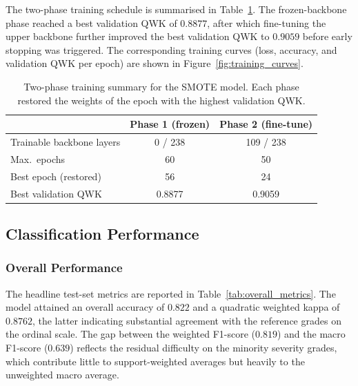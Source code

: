 The two-phase training schedule is summarised in
Table~\ref{tab:training_summary}. The frozen-backbone phase reached a best
validation QWK of $0.8877$, after which fine-tuning the upper backbone further
improved the best validation QWK to $0.9059$ before early stopping was triggered.
The corresponding training curves (loss, accuracy, and validation QWK per epoch)
are shown in Figure~\ref{fig:training_curves}.

\begin{table}[H]
\centering
\caption{Two-phase training summary for the SMOTE model. Each phase restored the
weights of the epoch with the highest validation QWK.}
\label{tab:training_summary}
\begin{tabular}{lcc}
\toprule
 & Phase 1 (frozen) & Phase 2 (fine-tune) \\
\midrule
Trainable backbone layers & 0 / 238   & 109 / 238 \\
Max.\ epochs               & 60        & 50        \\
Best epoch (restored)      & 56        & 24        \\
Best validation QWK        & 0.8877    & 0.9059    \\
\bottomrule
\end{tabular}
\end{table}


\subsection{Classification Performance}
\label{subsec:classification_results}

\subsubsection{Overall Performance}
\label{subsubsec:overall_performance}

The headline test-set metrics are reported in Table~\ref{tab:overall_metrics}. The
model attained an overall accuracy of $0.822$ and a quadratic weighted kappa of
$0.8762$, the latter indicating substantial agreement with the reference grades on
the ordinal scale. The gap between the weighted F1-score ($0.819$) and the macro
F1-score ($0.639$) reflects the residual difficulty on the minority severity grades,
which contribute little to support-weighted averages but heavily to the unweighted
macro average.

